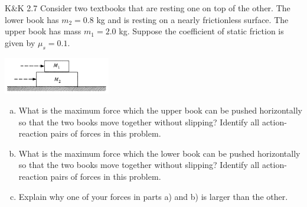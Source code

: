 \documentclass{esg8012pset}
\begin{document}
\begin{problem}{K\&K 2.7}
  Consider two textbooks that are resting one on top of the other. The lower book has $m_2 = 0.8$ kg and is resting on a nearly frictionless surface. The upper book has mass $m_1 = 2.0$ kg. Suppose the coefficient of static friction is given by $\mu_s = 0.1$.
  \begin{center}\includegraphics[width=0.35\textwidth]{ps02_2}\end{center}
  \begin{enumerate}[a)]
    \item What is the maximum force which the upper book can be pushed horizontally so that the two books move together without slipping? Identify all action-reaction pairs of forces in this problem.
    \item What is the maximum force which the lower book can be pushed horizontally so that the two books move together without slipping? Identify all action-reaction pairs of forces in this problem.
    \item Explain why one of your forces in parts a) and b) is larger than the other.
  \end{enumerate}
\end{problem}
\end{document}

